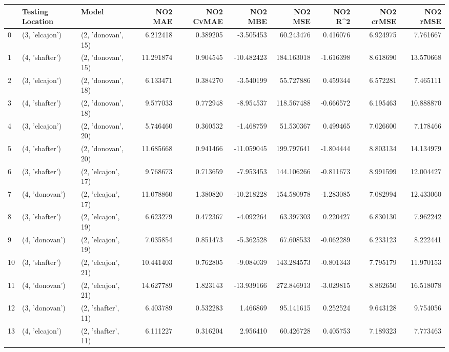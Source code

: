 \begin{tabular}{lllrrrrrrr}
\toprule
{} & Testing Location &               Model &    NO2 MAE &  NO2 CvMAE &    NO2 MBE &     NO2 MSE &   NO2 R\textasciicircum2 &  NO2 crMSE &   NO2 rMSE \\
\midrule
0  &   (3, 'elcajon') &  (2, 'donovan', 15) &   6.212418 &   0.389205 &  -3.505453 &   60.243476 &  0.416076 &   6.924975 &   7.761667 \\
1  &   (4, 'shafter') &  (2, 'donovan', 15) &  11.291874 &   0.904545 & -10.482423 &  184.163018 & -1.616398 &   8.618690 &  13.570668 \\
2  &   (3, 'elcajon') &  (2, 'donovan', 18) &   6.133471 &   0.384270 &  -3.540199 &   55.727886 &  0.459344 &   6.572281 &   7.465111 \\
3  &   (4, 'shafter') &  (2, 'donovan', 18) &   9.577033 &   0.772948 &  -8.954537 &  118.567488 & -0.666572 &   6.195463 &  10.888870 \\
4  &   (3, 'elcajon') &  (2, 'donovan', 20) &   5.746460 &   0.360532 &  -1.468759 &   51.530367 &  0.499465 &   7.026600 &   7.178466 \\
5  &   (4, 'shafter') &  (2, 'donovan', 20) &  11.685668 &   0.941466 & -11.059045 &  199.797641 & -1.804444 &   8.803134 &  14.134979 \\
6  &   (3, 'shafter') &  (2, 'elcajon', 17) &   9.768673 &   0.713659 &  -7.953453 &  144.106266 & -0.811673 &   8.991599 &  12.004427 \\
7  &   (4, 'donovan') &  (2, 'elcajon', 17) &  11.078860 &   1.380820 & -10.218228 &  154.580978 & -1.283085 &   7.082994 &  12.433060 \\
8  &   (3, 'shafter') &  (2, 'elcajon', 19) &   6.623279 &   0.472367 &  -4.092264 &   63.397303 &  0.220427 &   6.830130 &   7.962242 \\
9  &   (4, 'donovan') &  (2, 'elcajon', 19) &   7.035854 &   0.851473 &  -5.362528 &   67.608533 & -0.062289 &   6.233123 &   8.222441 \\
10 &   (3, 'shafter') &  (2, 'elcajon', 21) &  10.441403 &   0.762805 &  -9.084039 &  143.284573 & -0.801343 &   7.795179 &  11.970153 \\
11 &   (4, 'donovan') &  (2, 'elcajon', 21) &  14.627789 &   1.823143 & -13.939166 &  272.846913 & -3.029815 &   8.862650 &  16.518078 \\
12 &   (3, 'donovan') &  (2, 'shafter', 11) &   6.403789 &   0.532283 &   1.466869 &   95.141615 &  0.252524 &   9.643128 &   9.754056 \\
13 &   (4, 'elcajon') &  (2, 'shafter', 11) &   6.111227 &   0.316204 &   2.956410 &   60.426728 &  0.405753 &   7.189323 &   7.773463 \\

\end{tabular}
